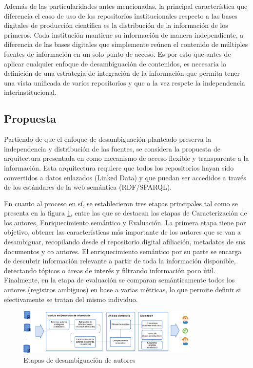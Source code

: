 \documentclass[conference]{IEEEtran}
\begin{document}
Además de las particularidades antes mencionadas, la principal característica que diferencia el caso de uso de los repositorios institucionales respecto a las bases digitales de producción científica  es la distribución de la información de los primeros. Cada institución mantiene su información de manera independiente, a diferencia de las bases digitales que simplemente reúnen el contenido de múltiples fuentes de información en un solo punto de acceso. Es por esto que antes de aplicar cualquier enfoque de desambiguación de contenidos, es necesaria la definición de una estrategia de integración de la información que permita tener una vista unificada de varios repositorios y que a la vez respete la independencia interinstitucional. 

\subsection{Propuesta}
Partiendo de que el enfoque de desambiguación planteado preserva la independencia y distribución  de las fuentes, se considera la propuesta de arquitectura presentada en \cite{segarra2016integration} como mecanismo de acceso flexible y transparente a la información.  Esta arquitectura requiere que todos los repositorios hayan sido convertidos a datos enlazados (Linked Data) y que puedan ser accedidos a través de los estándares de la web semántica (RDF/SPARQL).

En cuanto al proceso en sí, se establecieron tres etapas principales tal como se presenta en la figura \ref{fig:etapas}, entre las que se destacan las etapas de Caracterización de los autores, Enriquecimiento semántico y Evaluación. La primera etapa tiene por objetivo, obtener las características más importante de los autores que se van a desambiguar, recopilando desde el repositorio digital afiliación, metadatos de sus documentos y co autores. El enriquecimiento semántico por su parte se encarga de descubrir información relevante a partir de toda la información disponible, detectando tópicos o áreas de interés y filtrando información poco útil. Finalmente, en la etapa de evaluación se comparan semánticamente todos los autores (registros ambiguos) en base a varias métricas, lo que permite definir si efectivamente se tratan del mismo individuo. 

\begin{figure}[!t]
\centering
\includegraphics[width=0.8\textwidth]{arquitectura}
\caption{Etapas de desambiguaci\'on de autores}
\label{fig:etapas}
\end{figure}
\end{document}
